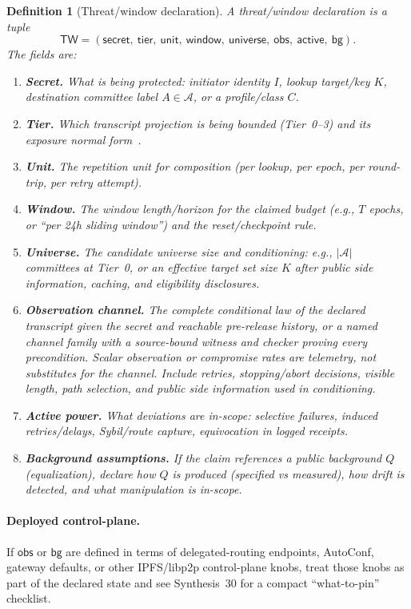 \documentclass[11pt]{article}
\newtheorem{definition}{Definition}
\begin{document}
\begin{definition}[Threat/window declaration]
A threat/window declaration is a tuple
\[
\mathsf{TW}=(\mathsf{secret},\ \mathsf{tier},\ \mathsf{unit},\ \mathsf{window},\ \mathsf{universe},\ \mathsf{obs},\ \mathsf{active},\ \mathsf{bg}).
\]
The fields are:
\begin{enumerate}[leftmargin=*]
\item \textbf{Secret.} What is being protected: initiator identity $I$, lookup target/key $K$, destination committee label $A\in\mathcal A$, or a profile/class $C$.
\item \textbf{Tier.} Which transcript projection is being bounded (Tier~0--3) and its exposure normal form~\cite{series:traceifaces}.
\item \textbf{Unit.} The repetition unit for composition (per lookup, per epoch, per round-trip, per retry attempt).
\item \textbf{Window.} The window length/horizon for the claimed budget (e.g., $T$ epochs, or ``per 24h sliding window'') and the reset/checkpoint rule.
\item \textbf{Universe.} The candidate universe size and conditioning: e.g., $|\mathcal A|$ committees at Tier~0, or an effective target set size $K$ after public side information, caching, and eligibility disclosures.
\item \textbf{Observation channel.} The complete conditional law of the declared transcript given the secret and reachable pre-release history, or a named channel family with a source-bound witness and checker proving every precondition. Scalar observation or compromise rates are telemetry, not substitutes for the channel. Include retries, stopping/abort decisions, visible length, path selection, and public side information used in conditioning.
\item \textbf{Active power.} What deviations are in-scope: selective failures, induced retries/delays, Sybil/route capture, equivocation in logged receipts.
\item \textbf{Background assumptions.} If the claim references a public background $Q$ (equalization), declare how $Q$ is produced (specified vs measured), how drift is detected, and what manipulation is in-scope.
\end{enumerate}
\end{definition}

\paragraph{Deployed control-plane.}
If $\mathsf{obs}$ or $\mathsf{bg}$ are defined in terms of delegated-routing endpoints, AutoConf, gateway defaults, or other IPFS/libp2p control-plane knobs,
treat those knobs as part of the declared state and see Synthesis~30 for a compact ``what-to-pin'' checklist.\cite{series:deployedsurfaces}
\end{document}
